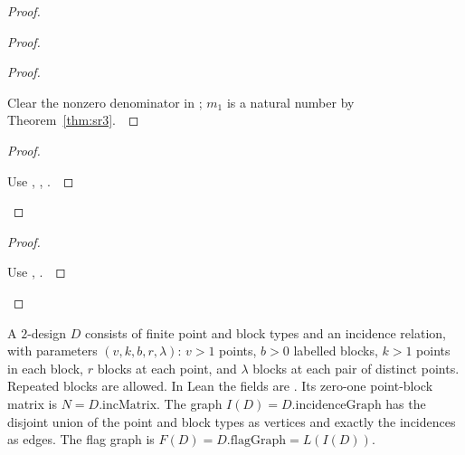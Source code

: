 \documentclass[11pt]{amsart}
\let\qed\relax
\theoremstyle{definition}
\newcommand{\code}[1]{\ifmmode\text{\small\nolinkurl{#1}}\else{\small\nolinkurl{#1}}\fi}
\begin{document}
\begin{proof}
\begin{proof}
\begin{proof}
\pf\ \raggedright Clear the nonzero denominator in ; $m_1$ is a natural number by Theorem~\ref{thm:sr3}.~\qed
\end{proof}
\qedstep
\begin{proof}
\pf\ \raggedright Use , , .~\qed
\end{proof}
\end{proof}
\qedstep
\begin{proof}
\pf\ \raggedright Use , .~\qed
\end{proof}
\end{proof}

\begin{definition}\label{def:design}
\uses{}
\mbox{}\par\nobreak
{}
A $2$-design $D$ consists of finite point and block types and an incidence
relation, with parameters $(v,k,b,r,\lambda)$: $v>1$ points, $b>0$
labelled blocks, $k>1$ points in each block, $r$ blocks at each point,
and $\lambda$ blocks at each pair of distinct points. Repeated blocks
are allowed. In Lean the fields are \code{v k b r lam}.
Its zero-one point-block matrix is $N=D.\mathrm{incMatrix}$.
The graph $I(D)=D.\mathrm{incidenceGraph}$ has the disjoint union of the
point and block types as vertices and exactly the incidences as edges.
The flag graph is $F(D)=D.\mathrm{flagGraph}=L(I(D))$.
\end{definition}
\end{document}
